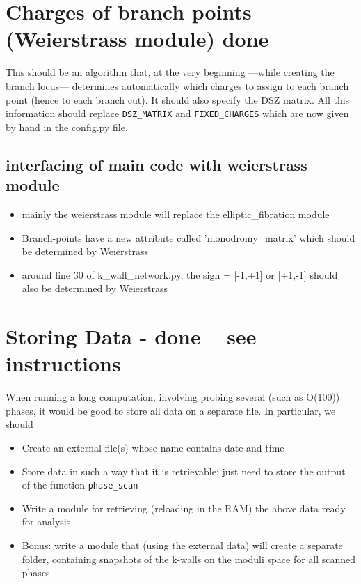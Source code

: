 \documentclass[11pt]{report}
\begin{document}
\section{Charges of branch points (Weierstrass module) {\color{red} \bf done}}
This should be an algorithm that, at the very beginning ---while creating the branch locus--- determines automatically which charges to assign to each branch point (hence to each branch cut).
It should also specify the DSZ matrix. All this information should replace {\tt DSZ\_MATRIX} and {\tt FIXED\_CHARGES} which are now given by hand in the config.py file.


\subsection{interfacing of main code with weierstrass module}
\begin{itemize}
\item mainly the weierstrass module will replace the elliptic\_fibration module
\item Branch-points have a new attribute called 'monodromy\_matrix' which should be determined by Weierstrass
\item around line 30 of k\_wall\_network.py, the sign = [-1,+1] or [+1,-1] should also be determined by Weierstrass
\end{itemize}


\section{Storing Data - {\color{red} \bf done -- see instructions}}
When running a long computation, involving probing several (such as O(100)) phases, it would be good to store all data on a separate file.
In particular, we should 
\begin{itemize}
	\item[\checkmark] Create an external file(s) whose name contains date and time
	\item[\checkmark] Store data in such a way that it is retrievable: just need to store the output of the function {\texttt{phase\_scan}}
	\item[\checkmark] Write a module for retrieving (reloading in the RAM) the above data ready for analysis
	\item[\checkmark] Bonus: write a module that (using the external data) will create a separate folder, containing snapshots of the k-walls on the moduli space for all scanned phases
\end{itemize}
\end{document}
